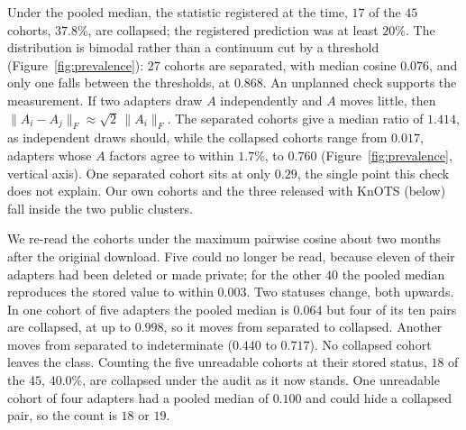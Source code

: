 Under the pooled median, the statistic registered at the time, $17$ of the $45$
cohorts, $37.8\%$, are collapsed; the registered prediction was at least
$20\%$. The
distribution is bimodal rather than a continuum cut by a threshold
(Figure~\ref{fig:prevalence}): $27$ cohorts are separated, with median cosine
$0.076$, and only one falls between the thresholds, at $0.868$.
An unplanned check supports the measurement. If two adapters draw $A$
independently and $A$ moves little, then
$\|A_i - A_j\|_F \approx \sqrt2\,\|A_i\|_F$. The separated cohorts give a
median ratio of $1.414$, as independent draws should, while the collapsed
cohorts range from $0.017$, adapters whose $A$ factors agree to within
$1.7\%$, to $0.760$ (Figure~\ref{fig:prevalence}, vertical axis). One separated
cohort sits at only $0.29$, the single point this check does not explain. Our
own cohorts and the three released with KnOTS (below) fall inside the two
public clusters.

We re-read the cohorts under the maximum pairwise cosine about two months
after the original download. Five could no longer be read, because eleven of
their adapters had been deleted or made private; for the other $40$ the pooled
median reproduces the stored value to within $0.003$. Two statuses change,
both upwards. In one cohort of five adapters the pooled median is $0.064$ but
four of its ten pairs are collapsed, at up to $0.998$, so it moves from
separated to collapsed. Another moves from separated to indeterminate ($0.440$
to $0.717$). No collapsed cohort leaves the class. Counting the five
unreadable cohorts at their stored status, $18$ of the $45$, $40.0\%$, are
collapsed under the audit as it now stands. One unreadable cohort of four
adapters had a pooled median of $0.100$ and could hide a collapsed pair, so the
count is $18$ or $19$.

